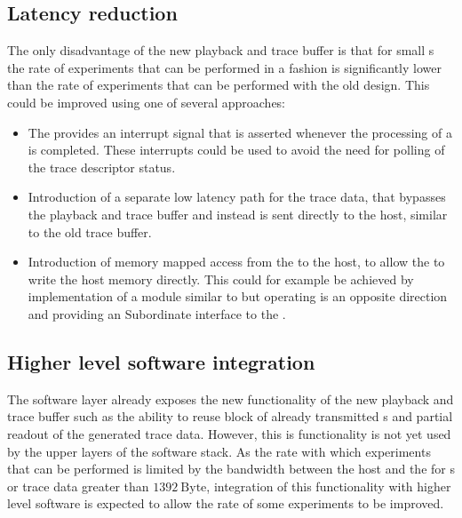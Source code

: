 \subsection{Latency reduction}\label{sec:latency_reduction}
The only disadvantage of the new playback and trace buffer is that for small \PlaybackProgram{}s the rate of experiments that can be performed in a \HWinTheLoop{} fashion is significantly lower than the rate of experiments that can be performed with the old design. This could be improved using one of several approaches:
\begin{itemize}
  \item The \AXIDMA{} provides an interrupt signal that is asserted whenever the processing of a \descriptor{} is completed. These interrupts could be used to avoid the need for polling of the trace descriptor status.
  \item Introduction of a separate low latency path for the trace data, that bypasses the playback and trace buffer and instead is sent directly to the host, similar to the old trace buffer.
  \item Introduction of memory mapped access from the \FPGA{} to the host, to allow the \FPGA{} to write the host memory directly. This could for example be achieved by implementation of a module similar to \FAXI{} but operating is an opposite direction and providing an \AXI{} Subordinate interface to the \FPGA{}.
\end{itemize}
\subsection{Higher level software integration}
The \ayo{} software layer already exposes the new functionality of the new playback and trace buffer such as the ability to reuse block of already transmitted \PlaybackProgram{}s and partial readout of the generated trace data. However, this is functionality is not yet used by the upper layers of the \BSS{} software stack. As the rate with which experiments that can be performed is limited by the bandwidth between the host and the \FPGA{} for \PlaybackProgram{}s or trace data greater than $\num{1392}~\text{Byte}$, integration of this functionality with higher level software is expected to allow the rate of some experiments to be improved.

